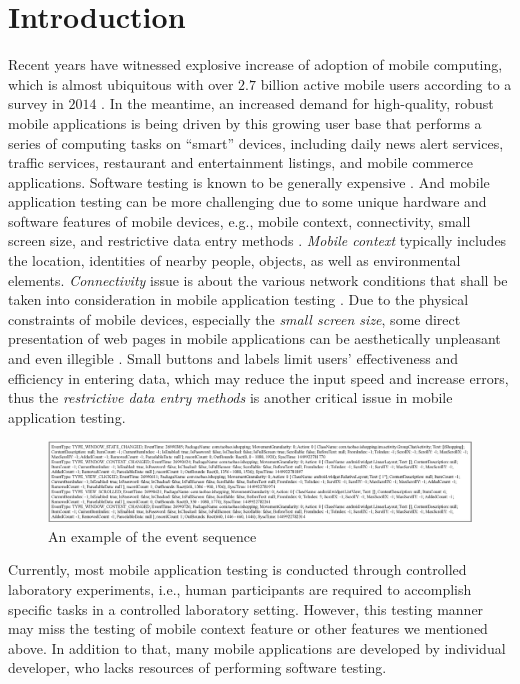 \documentclass[10pt,conference]{IEEEtran}
\begin{document}
\section{Introduction}
Recent years have witnessed explosive increase of adoption of mobile computing, which is
almost ubiquitous with over $2.7$ billion active mobile users according to a survey in $2014$ \cite{ericsson2014ericsson}.
In the meantime, an increased demand for high-quality, robust mobile applications is being driven by this
growing user base that performs a series of computing tasks on ``smart'' devices, including daily news alert services,
traffic services, restaurant and entertainment listings, and mobile commerce applications.
Software testing is known to be generally expensive \cite{tassey2002economic}.
And mobile application testing can be more challenging due to some unique hardware and software features of mobile devices, 
e.g., mobile context, connectivity, small screen size, and restrictive data entry methods \cite{zhang2005challenges}.
\emph{Mobile context} typically includes the location, identities of nearby people, objects, as well as environmental elements.
\emph{Connectivity} issue is about the various network conditions that shall be taken into consideration in mobile application testing \cite{longoria2001designing}. Due to the
physical constraints of mobile devices, especially the \emph{small screen size}, some direct presentation of web pages
in mobile applications can be aesthetically unpleasant and even illegible \cite{bickmore1997digestor}.
Small buttons and labels limit users' effectiveness and efficiency in entering data, which may reduce the input speed
and increase errors, thus the \emph{restrictive data entry methods} is another critical issue in mobile application testing.

\begin{figure}[!htbp]
\centering
\includegraphics[width=2\columnwidth]{Figure/eventSample.eps}
\caption{An example of the event sequence}
\label{eventSample}
\end{figure}


Currently, most mobile application testing is conducted through controlled laboratory experiments, i.e., human participants
are required to accomplish specific tasks in a controlled laboratory setting. However, this testing manner may miss the testing
of mobile context feature or other features we mentioned above. In addition to that, many mobile applications are developed by individual
developer, who lacks resources of performing software testing.
\end{document}
